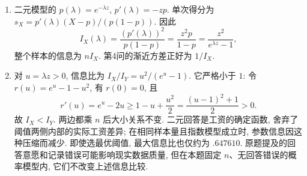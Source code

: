 \begin{solution}
\begin{enumerate}[label=\arabic*.]
\begin{enumerate}[label=(\alph*)]
\item 二元模型的 $p(\lambda)=e^{-\lambda z}$, $p'(\lambda)=-zp$. 单次得分为
$s_X=p'(\lambda)(X-p)/(p(1-p))$. 因此
\[
I_X(\lambda)=\frac{(p'(\lambda))^2}{p(1-p)}
=\frac{z^2p}{1-p}=\frac{z^2}{e^{\lambda z}-1},
\]
整个样本的信息为 $nI_X$. 第4问的渐近方差正好为 $1/I_X$.
\item 对 $u=\lambda z>0$, 信息比为 $I_X/I_Y=u^2/(e^u-1)$. 它严格小于 $1$: 令 $r(u)=e^u-1-u^2$, 有 $r(0)=0$, 且
\[
r'(u)=e^u-2u\ge1-u+\frac{u^2}2
=\frac{(u-1)^2+1}{2}>0.
\]
故 $I_X<I_Y$. 两边都乘 $n$ 后大小关系不变. 二元回答是工资的确定函数, 舍弃了阈值两侧内部的实际工资差异; 在相同样本量且指数模型成立时, 参数信息因这种压缩而减少. 即使选最优阈值, 最大信息比也仅约为 $.647610$. 原题提及的回答意愿和记录错误可能影响现实数据质量, 但在本题固定 $n$、无回答错误的概率模型内, 它们不改变上述信息比较.
\end{enumerate}
\end{enumerate}
\end{solution}
